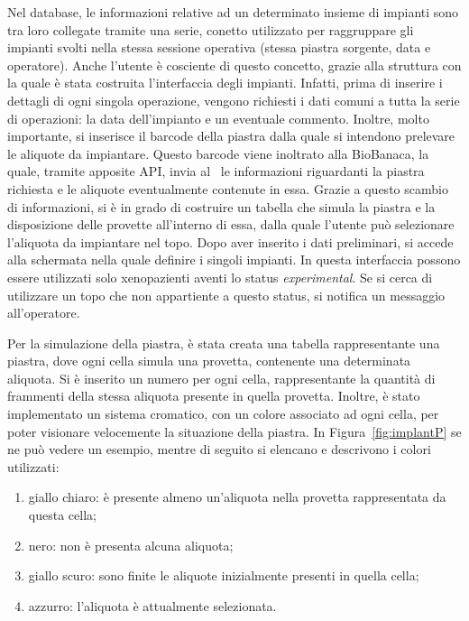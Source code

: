Nel database, le informazioni relative ad un determinato insieme di impianti sono tra loro collegate tramite una serie, conetto utilizzato per raggruppare gli impianti svolti nella stessa sessione operativa (stessa piastra sorgente, data e operatore). Anche l'utente \`e cosciente di questo concetto, grazie alla struttura con la quale \`e stata costruita l'interfaccia degli impianti. Infatti, prima di inserire i dettagli di ogni singola operazione, vengono richiesti i dati comuni a tutta la serie di operazioni: la data dell'impianto e un eventuale commento. Inoltre, molto importante, si inserisce il barcode della piastra dalla quale si intendono prelevare le aliquote da impiantare. Questo barcode viene inoltrato alla BioBanaca, la quale, tramite apposite API, invia al \Xeno\ le informazioni riguardanti la piastra richiesta e le aliquote eventualmente contenute in essa. Grazie a questo scambio di informazioni, si \`e in grado di costruire un tabella che simula la piastra e la disposizione delle provette all'interno di essa, dalla quale l'utente pu\`o selezionare l'aliquota da impiantare nel topo. Dopo aver inserito i dati preliminari, si accede alla schermata nella quale definire i singoli impianti. In questa interfaccia possono essere utilizzati solo xenopazienti aventi lo status \textit{experimental}. Se si cerca di utilizzare un topo che non appartiente a questo status, si notifica un messaggio all'operatore.

Per la simulazione della piastra, \`e stata creata una tabella rappresentante una piastra, dove ogni cella simula una provetta, contenente una determinata aliquota. Si \`e inserito un numero per ogni cella, rappresentante la quantit\`a di frammenti della stessa aliquota presente in quella provetta. Inoltre, \`e stato implementato un sistema cromatico, con un colore associato ad ogni cella, per poter visionare velocemente la situazione della piastra. In Figura~\ref{fig:implantP} se ne pu\`o vedere un esempio, mentre di seguito si elencano e descrivono i colori utilizzati:
\begin{enumerate} 
  \item giallo chiaro: \`e presente almeno un'aliquota nella provetta rappresentata da questa cella;
  \item nero: non \`e presenta alcuna aliquota;
  \item giallo scuro: sono finite le aliquote inizialmente presenti in quella cella;
  \item azzurro: l'aliquota \`e attualmente selezionata.
\end{enumerate} 

